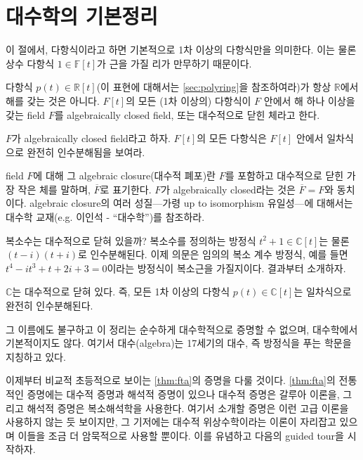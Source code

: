 \section{대수학의 기본정리}
\begin{remark}
    이 절에서, 다항식이라고 하면 기본적으로 1차 이상의 다항식만을 의미한다. 이는 물론 상수 다항식 $1\in\mathbb{F}[t]$가 근을 가질 리가 만무하기 때문이다. 
\end{remark}
다항식 $p(t)\in\mathbb{R}[t]$(이 표현에 대해서는 \cref{sec:polyring}을 참조하여라)가 항상 $\mathbb{R}$에서 해를 갖는 것은 아니다. $F[t]$의 모든 (1차 이상의) 다항식이 $F$ 안에서 해 하나 이상을 갖는 field $F$를 algebraically closed field, 또는 대수적으로 닫힌 체라고 한다. 
\begin{exercise}
    $F$가 algebraically closed field라고 하자. $F[t]$의 모든 다항식은 $F[t]$ 안에서 일차식으로 완전히 인수분해됨을 보여라. 
\end{exercise}
\begin{remark}
    field $F$에 대해 그 algebraic closure(대수적 폐포)란 $F$를 포함하고 대수적으로 닫힌 가장 작은 체를 말하며, $\overline{F}$로 표기한다. $F$가 algebraically closed라는 것은 $\overline{F}=F$와 동치이다. algebraic closure의 여러 성질---가령 up to isomorphism 유일성---에 대해서는 대수학 교재(e.g. 이인석 - ``대수학'')를 참조하라. 
\end{remark}
복소수는 대수적으로 닫혀 있을까? 복소수를 정의하는 방정식 $t^2+1\in \mathbb{C}[t]$는 물론 $(t-i)(t+i)$로 인수분해된다. 이제 의문은 임의의 복소 계수 방정식, 예를 들면 $t^4-it^3+t+2i+3=0$이라는 방정식이 복소근을 가질지이다. 결과부터 소개하자. 
\begin{theorem}[대수학의 기본 정리]\label{thm:fta}
$\mathbb{C}$는 대수적으로 닫혀 있다. 즉, 모든 1차 이상의 다항식 $p(t)\in \mathbb{C}[t]$는 일차식으로 완전히 인수분해된다. 
\end{theorem}
\begin{remark}
그 이름에도 불구하고 이 정리는 순수하게 대수학적으로 증명할 수 없으며, 대수학에서 기본적이지도 않다. 여기서 대수(algebra)는 17세기의 대수, 즉 방정식을 푸는 학문을 지칭하고 있다. 
\end{remark}
이제부터 비교적 초등적으로 보이는 \cref{thm:fta}의 증명을 다룰 것이다.
\cref{thm:fta}의 전통적인 증명에는 대수적 증명과 해석적 증명이 있으나 대수적 증명은 갈루아 이론을, 그리고 해석적 증명은 복소해석학을 사용한다.
여기서 소개할 증명은 이런 고급 이론을 사용하지 않는 듯 보이지만, 그 기저에는 대수적 위상수학이라는 이론이 자리잡고 있으며 이들을 조금 더 암묵적으로 사용할 뿐이다.
이를 유념하고 다음의 guided tour을 시작하자.
